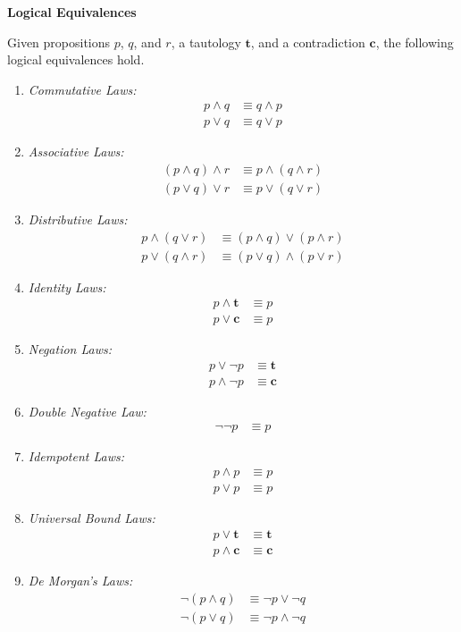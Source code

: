 \documentclass[12pt,letterpaper]{article}
\newcommand{\taut}{\mathbf{t}}
\newcommand{\cont}{\mathbf{c}}
\newcommand{\logicalRule}[2]{
    \textit{#1}
    \begin{align*}
        #2
    \end{align*}
}
\begin{document}
\begin{center}
    \Large
	\bfseries Logical Equivalences
\end{center}
Given propositions $p$, $q$, and $r$, a tautology $\taut$, and a contradiction
$\cont$, the following logical equivalences hold.

\begin{enumerate}[1.]
    \item
    \logicalRule{Commutative Laws:}{
        p \land q &\equiv q \land p \\
        p \lor  q &\equiv q \lor  p
    }

    \item
    \logicalRule{Associative Laws:}{
        (p \land q) \land r &\equiv p \land (q \land r) \\
        (p \lor  q) \lor  r &\equiv p \lor  (q \lor  r)
    }

    \item
    \logicalRule{Distributive Laws:}{
        p \land (q \lor  r) &\equiv (p \land q) \lor  (p \land r) \\
        p \lor  (q \land r) &\equiv (p \lor  q) \land (p \lor  r)
    }

    \item
    \logicalRule{Identity Laws:}{
        p \land \taut &\equiv p \\
        p \lor  \cont &\equiv p
    }

    \item
    \logicalRule{Negation Laws:}{
        p \lor  \lnot p &\equiv \taut \\
        p \land \lnot p &\equiv \cont
    }

    \item
    \logicalRule{Double Negative Law:}{
        \lnot\lnot p &\equiv p
    }

    \item
    \logicalRule{Idempotent Laws:}{
        p \land p &\equiv p \\
        p \lor  p &\equiv p
    }

    \item
    \logicalRule{Universal Bound Laws:}{
        p \lor  \taut &\equiv \taut \\
        p \land \cont &\equiv \cont
    }

    \item
    \logicalRule{De Morgan's Laws:}{
        \lnot(p \land q) &\equiv \lnot p \lor  \lnot q \\
        \lnot(p \lor  q) &\equiv \lnot p \land \lnot q
    }


\end{enumerate}
\end{document}
